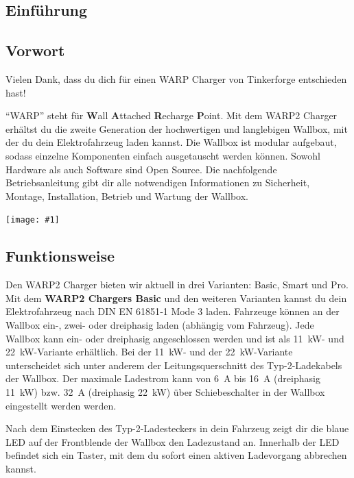 \documentclass[a4paper,10pt]{article}
\newcommand{\gfx}[1]{\texttt{[image: \#1]}}
\begin{document}
\begin{multicols*}{2}
	\tableofcontents
	\newpage
	\section{Einführung}
	\subsection{Vorwort} Vielen Dank, dass du
	dich für einen WARP Charger von Tinkerforge entschieden hast!

	\enquote{WARP} steht
	für \textbf{W}all \textbf{A}ttached
	\textbf{R}echarge \textbf{P}oint. Mit dem WARP2 Charger
	erhältst du die zweite Generation der hochwertigen und langlebigen Wallbox,
	mit der du dein Elektrofahrzeug laden kannst.
	Die Wallbox ist modular aufgebaut, sodass
	einzelne Komponenten einfach ausgetauscht werden können. Sowohl Hardware als
	auch Software sind Open Source. Die nachfolgende Betriebsanleitung gibt dir
	alle notwendigen Informationen zu Sicherheit, Montage, Installation, Betrieb
	und Wartung der Wallbox.

	\gfx{./img_warp2/resized/type_2_connector_ready}\vspace{-0.3cm}

	\subsection{Funktionsweise}
	\vspace{-0.1cm}
	Den WARP2 Charger bieten wir aktuell in drei Varianten: Basic, Smart und Pro.
	Mit dem \textbf{WARP2 Chargers Basic} und den weiteren Varianten kannst du dein
	Elektrofahrzeug nach DIN EN 61851‐1 Mode 3 laden.
	Fahrzeuge können an der Wallbox ein-, zwei- oder dreiphasig laden
	(abhängig vom Fahrzeug). Jede Wallbox kann ein- oder dreiphasig
	angeschlossen werden und ist als \SI{11}{\kilo\watt}- und
	\SI{22}{\kilo\watt}-Variante erhältlich. Bei der \SI{11}{\kilo\watt}- und
	der \SI{22}{\kilo\watt}-Variante unterscheidet sich unter anderem der
	Leitungsquerschnitt des Typ-2-Ladekabels der Wallbox. Der maximale Ladestrom
	kann von \SI{6}{\ampere} bis \SI{16}{\ampere}
	(dreiphasig \SI{11}{\kilo\watt}) bzw. \SI{32}{\ampere} (dreiphasig \SI{22}{\kilo\watt}) über
	Schiebeschalter in der Wallbox eingestellt werden werden.

	\vspace{-0.1cm}
	Nach dem Einstecken des Typ-2-Ladesteckers in
	dein Fahrzeug zeigt dir die blaue LED auf der Frontblende der Wallbox den
	Ladezustand an. Innerhalb der LED befindet sich ein Taster, mit dem
	du sofort einen aktiven Ladevorgang abbrechen kannst.


\end{multicols*}
\end{document}
